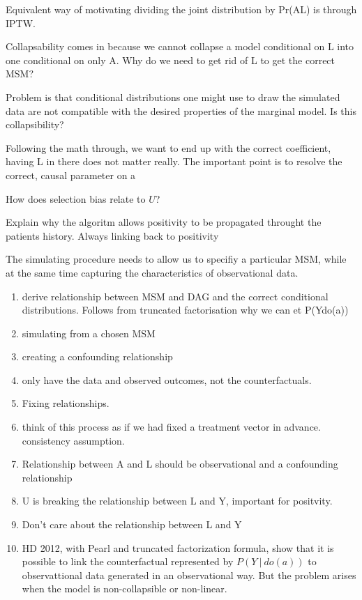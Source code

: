 \documentclass[11pt]{article}
\begin{document}
Equivalent way of motivating dividing the joint distribution by
Pr(A\textbar{}L) is through IPTW.

Collapsability comes in because we cannot collapse a model conditional
on L into one conditional on only A. Why do we need to get rid of L to
get the correct MSM?

Problem is that conditional distributions one might use to draw the
simulated data are not compatible with the desired properties of the
marginal model. Is this collapsibility?

Following the math through, we want to end up with the correct
coefficient, having L in there does not matter really. The important
point is to resolve the correct, causal parameter on a

How does selection bias relate to \(U\)?

Explain why the algoritm allows positivity to be propagated throught the
patients history. Always linking back to positivity

The simulating procedure needs to allow us to specifiy a particular MSM,
while at the same time capturing the characteristics of observational
data.

\begin{enumerate}
\def\labelenumi{\arabic{enumi}.}
\item
  derive relationship between MSM and DAG and the correct conditional
  distributions. Follows from truncated factorisation why we can et
  P(Y\textbar{}do(a))
\item
  simulating from a chosen MSM
\item
  creating a confounding relationship
\item
  only have the data and observed outcomes, not the counterfactuals.
\item
  Fixing relationships.
\item
  think of this process as if we had fixed a treatment vector in
  advance. consistency assumption.
\item
  Relationship between A and L should be observational and a confounding
  relationship
\item
  U is breaking the relationship between L and Y, important for
  positvity.
\item
  Don't care about the relationship between L and Y
\item
  HD 2012, with Pearl and truncated factorization formula, show that it
  is possible to link the counterfactual represented by
  \(P(Y\ |\ do(a))\) to observattional data generated in an
  observational way. But the problem arises when the model is
  non-collapsible or non-linear.
\end{enumerate}
\end{document}
